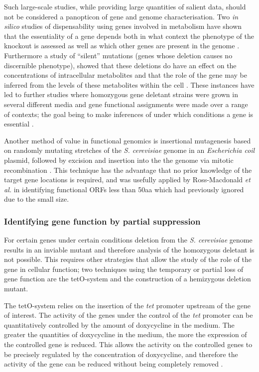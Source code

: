 Such large-scale studies, while providing large quantities of salient data, should not be considered a panopticon of gene and genome characterisation. Two \emph{in silico} studies of dispensability using genes involved in metabolism have shown that the essentiality of a gene depends both in what context the phenotype of the knockout is assessed as well as which other genes are present in the genome \cite{pal2006,papp2004}. Furthermore a study of ``silent'' mutations (genes whose deletion causes no discernible phenotype), showed that these deletions do have an effect on the concentrations of intracellular metabolites and that the role of the gene may be inferred from the levels of these metabolites within the cell \cite{raamsdonk2001}. These instances have led to further studies where homozygous gene deletant strains were grown in several different media and gene functional assignments were made over a range of contexts; the goal being to make inferences of under which conditions a gene is essential \cite{dudley2005,giaever2002}.

Another method of value in functional genomics is insertional mutagenesis based on randomly mutating stretches of the \emph{S. cerevisiae} genome in an \emph{Escherichia coil} plasmid, followed by excision and insertion into the the genome via mitotic recombination \cite{vidan2001}. This technique has the advantage that no prior knowledge of the target gene locations is required, and was usefully applied by Ross-Macdonald \emph{et al.} \cite{ross-macdonald1999} in identifying functional ORFs less than 50aa which had previously ignored due to the small size.

\subsubsection{Identifying gene function by partial suppression}

For certain genes under certain conditions deletion from the \emph{S. cerevisiae} genome results in an inviable mutant and therefore analysis of the homozygous deletant is not possible. This requires other strategies that allow the study of the role of the gene in cellular function; two techniques using the temporary or partial loss of gene function are the tetO-system and the construction of a hemizygous deletion mutant.

The tetO-system relies on the insertion of the \emph{tet} promoter upstream of the gene of interest. The activity of the genes under the control of the \emph{tet} promoter can be quantitatively controlled by the amount of doxycycline in the medium. The greater the quantities of doxycycline in the medium, the more the expression of the controlled gene is reduced. This allows the activity on the controlled genes to be precisely regulated by the concentration of doxycycline, and therefore the activity of the gene can be reduced without being completely removed \cite{mnaimneh2004}.

